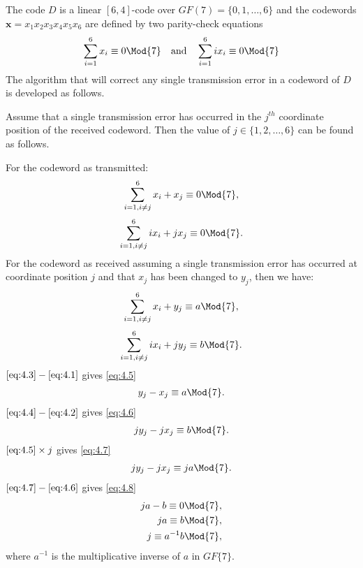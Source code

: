 The code $D$ is a linear $[6,4]$-code over $GF(7)=\{0,1,\ldots,6\}$ and the codewords $\bm{x}=x_1x_2x_3x_4x_5x_6$ are defined by two parity-check equations
\[
	\sum_{i=1}^6 x_i\equiv 0 \Mod{7}\quad\textrm{and}\quad \sum_{i=1}^6 ix_i\equiv 0 \Mod{7}
\]
The algorithm that will correct any single transmission error in a codeword of $D$ is developed as follows.

Assume that a single transmission error has occurred in the $j^{th}$ coordinate position of the received codeword. Then the value of $j \in \{1,2,\ldots,6\}$ can be found as follows.

For the codeword as transmitted:
\begin{align}
\label{eq:4.1}
	\sum_{i=1,i\neq j}^{6} x_i + x_j \equiv 0 \Mod{7},
\end{align}
\begin{align}
\label{eq:4.2}
	\sum_{i=1,i\neq j}^{6} ix_i + jx_j \equiv 0 \Mod{7}.
\end{align}
For the codeword as received assuming a single transmission error has occurred at coordinate position $j$ and that $x_j$ has been changed to $y_j$, then we have:
\begin{align}
\label{eq:4.3}
	\sum_{i=1,i\neq j}^{6} x_i + y_j \equiv a \Mod{7},
\end{align}
\begin{align}
\label{eq:4.4}
	\sum_{i=1,i\neq j}^{6} ix_i + jy_j \equiv b \Mod{7}.
\end{align}
$\eqref{eq:4.3} - \eqref{eq:4.1}$ gives \eqref{eq:4.5}
\begin{align}
\label{eq:4.5}
	y_j - x_j \equiv a \Mod{7}.
\end{align}
$\eqref{eq:4.4} - \eqref{eq:4.2}$ gives \eqref{eq:4.6}
\begin{align}
\label{eq:4.6}
	jy_j - jx_j  \equiv b \Mod{7}.
\end{align}
$\eqref{eq:4.5}\times j$ gives \eqref{eq:4.7}
\begin{align}
\label{eq:4.7}
	jy_j - jx_j \equiv ja \Mod{7}.
\end{align}
$\eqref{eq:4.7} - \eqref{eq:4.6}$ gives \eqref{eq:4.8}
\begin{align}
\label{eq:4.8}
	ja - b \equiv 0 \Mod{7},\nonumber\\
	ja \equiv b \Mod{7},\nonumber\\
	j \equiv a^{-1}b \Mod{7},
\end{align}
where $a^{-1}$ is the multiplicative inverse of $a$ in $GF\{7\}$.
